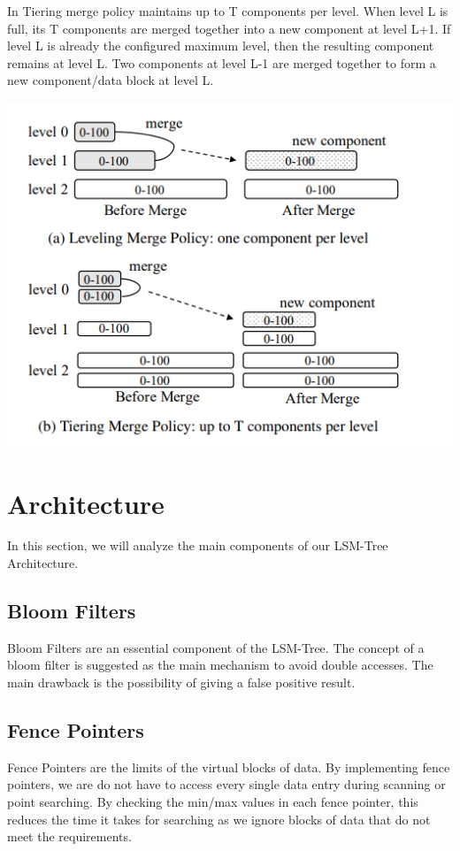 \documentclass[sigconf]{acmart}
\begin{document}
In Tiering merge policy maintains up to T components per level. When level L is full, its T components are merged together into a new component at level L+1. If level L is already the configured maximum level, then the resulting component remains at level L. Two components at level L-1 are merged together to form a new component/data block at level L. 

\includegraphics{images/MergingStrategies.PNG}

\section{Architecture}
In this section, we will analyze the main components of our LSM-Tree Architecture.

\subsection{Bloom Filters}
Bloom Filters are an essential component of the LSM-Tree. The concept of a bloom filter is suggested as the main mechanism to avoid double accesses. The main drawback is the possibility of giving a false positive result. 

\subsection{Fence Pointers}
Fence Pointers are the limits of the virtual blocks of data. By implementing fence pointers, we are do not have to access every single data entry during scanning or point searching. By checking the min/max values in each fence pointer, this reduces the time it takes for searching as we ignore blocks of data that do not meet the requirements.
\end{document}
